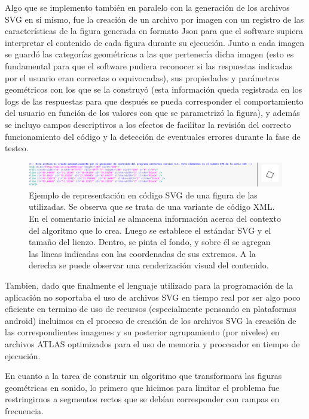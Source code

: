 \documentclass{article}
\begin{document}
    Algo que se implemento también en paralelo con la generación de los archivos SVG en si mismo, fue la creación de un archivo por imagen con un registro de las características de la figura generada en formato Json para que el software supiera interpretar el contenido de cada figura durante su ejecución. Junto a cada imagen se guardó las categorías geométricas a las que pertenecía dicha imagen (esto es fundamental para que el software pudiera reconocer si las respuestas indicadas por el usuario eran correctas o equivocadas), sus propiedades y parámetros geométricos con los que se la construyó (esta información queda registrada en los logs de las respuestas para que después se pueda corresponder el comportamiento del usuario en función de los valores con que se parametrizó la figura), y además se incluyo campos descriptivos a los efectos de facilitar la revisión del correcto funcionamiento del código y la detección de eventuales errores durante la fase de testeo. 
    
    \begin{figure}
        \center
        \includegraphics[width=\textwidth]{Imagenes/678SVG.png}
        \caption{Ejemplo de representación en código SVG de una figura de las utilizadas. Se observa que se trata de una variante de código XML. En el comentario inicial se almacena información acerca del contexto del algoritmo que lo crea. Luego se establece el estándar SVG y el tamaño del lienzo. Dentro, se pinta el fondo, y sobre él se agregan las lineas indicadas con las coordenadas de sus extremos. A la derecha se puede observar una renderización visual del contenido.}
        \label{fig:SVGtoPNG}
    \end{figure}
    
    Tambien, dado que finalmente el lenguaje utilizado para la programación de la aplicación no soportaba el uso de archivos SVG en tiempo real por ser algo poco eficiente en termino de uso de recursos (especialmente pensando en plataformas android) incluimos en el proceso de creación de los archivos SVG la creación de las correspondientes imagenes y su posterior agrupamiento (por niveles) en archivos ATLAS optimizados para el uso de memoria y procesador en tiempo de ejecución.
    
    En cuanto a la tarea de construir un algoritmo que transformara las figuras geométricas en sonido, lo primero que hicimos para limitar el problema fue restringirnos a segmentos rectos que se debían corresponder con rampas en frecuencia.
    
\end{document}
